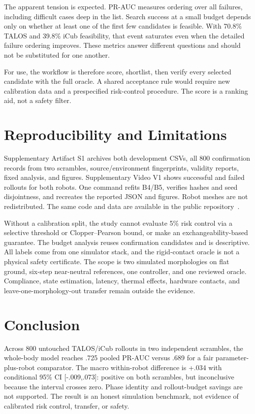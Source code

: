 \documentclass[letterpaper,10pt,conference]{IEEEtran}
\newcommand{\primarydelta}{.034}
\newcommand{\primaryci}{[-.009,.073]}
\begin{document}
The apparent tension is expected. PR-AUC measures ordering over all failures,
including difficult cases deep in the list. Search success at a small budget
depends only on whether at least one of the first few candidates is feasible.
With 70.8\% TALOS and 39.8\% iCub feasibility, that event saturates even when
the detailed failure ordering improves. These metrics answer different
questions and should not be substituted for one another.

For use, the workflow is therefore score, shortlist, then verify every selected
candidate with the full oracle. A shared acceptance rule would require new
calibration data and a prespecified risk-control procedure. The score is a
ranking aid, not a safety filter.

\section{Reproducibility and Limitations}
Supplementary Artifact S1 archives both development CSVs, all 800 confirmation
records from two scrambles, source/environment fingerprints, validity reports,
fixed analysis, and figures. Supplementary Video V1 shows successful and failed
rollouts for both robots. One command refits B4/B5, verifies hashes and seed
disjointness, and recreates the reported JSON and figures. Robot meshes are not
redistributed. The same code and data are available in the public
repository~\cite{zharinov2026repository}.

Without a calibration split, the study cannot evaluate 5\% risk control via a
selective threshold or Clopper--Pearson bound, or make an exchangeability-based
guarantee. The budget analysis reuses confirmation candidates and is
descriptive. All labels come from one simulator stack, and the rigid-contact
oracle is not a physical safety certificate. The scope is two simulated
morphologies on flat ground, six-step near-neutral references, one controller,
and one reviewed oracle. Compliance, state estimation, latency, thermal
effects, hardware contacts, and leave-one-morphology-out transfer remain
outside the evidence.

\section{Conclusion}
Across 800 untouched TALOS/iCub rollouts in two independent scrambles, the
whole-body model reaches .725 pooled PR-AUC versus .689 for a fair
parameter-plus-robot comparator. The macro within-robot difference is
+\primarydelta{} with conditional 95\% CI \primaryci{}: positive on both
scrambles, but inconclusive because the interval crosses zero. Phase identity
and rollout-budget savings are not supported. The result is an honest
simulation benchmark, not evidence of calibrated risk control, transfer, or
safety.
\end{document}
